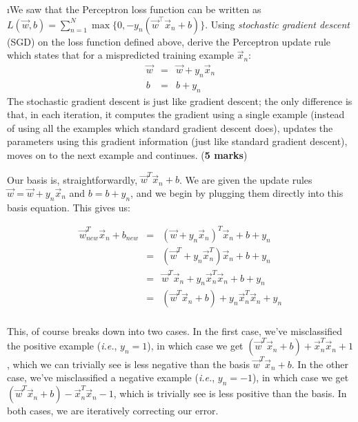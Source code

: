 \documentclass[fleqn]{article}
\begin{document}
\i We saw that the Perceptron loss function can be written
as $L(\vec{w},b) = \sum_{n=1}^N \max\{0,-y_n(\vec{w}^\top\vec{x}_n+b)\}$. 
Using \textit{stochastic gradient descent} (SGD) on the loss function 
defined above, derive the Perceptron update rule which states that 
for a mispredicted training example $\vec{x}_n$:
\begin{eqnarray}
 \vec{w} &=& \vec{w} + y_n \vec{x}_n \nonumber \\
  b &=& b + y_n \nonumber
\end{eqnarray}
The stochastic gradient descent is just like gradient descent; the only 
difference is that, in each iteration, it computes the gradient using a 
single example (instead of using all the examples which standard gradient
descent does), updates the parameters using this gradient information 
(just like standard gradient descent), moves on to the next example and 
continues. (\textbf{5 marks})

\begin{solution}
Our basis is, straightforwardly, $\vec{w}^T\vec{x}_n + b$. We are given the update rules $\vec{w} = \vec{w} + y_n\vec{x}_n$ and $b = b + y_n$, and we begin by plugging them directly into this basis equation. This gives us:

\begin{eqnarray*}
\vec{w}^T_{new}\vec{x}_n + b_{new} & = & (\vec{w} + y_n\vec{x}_n)^T \vec{x}_n + b + y_n \\
& = & (\vec{w}^T + y_n\vec{x}^T_n)\vec{x}_n + b + y_n \\
& = & \vec{w}^T\vec{x}_n + y_n\vec{x}^T_n\vec{x}_n + b + y_n \\
& = & (\vec{w}^T\vec{x}_n + b) + y_n\vec{x}^T_n\vec{x}_n + y_n \\
\end{eqnarray*}

This, of course breaks down into two cases. In the first case, we've misclassified the positive example (\textit{i.e.}, $y_n = 1$), in which case we get $(\vec{w}^T\vec{x}_n + b) + \vec{x}^T_n\vec{x}_n + 1$, which we can trivially see is less negative than the basis $\vec{w}^T\vec{x}_n + b$. In the other case, we've misclassified a negative example (\textit{i.e.}, $y_n = -1$), in which case we get $(\vec{w}^T\vec{x}_n + b) - \vec{x}^T_n\vec{x}_n - 1$, which is trivially see is less positive than the basis. In both cases, we are iteratively correcting our error.

\end{solution}
\end{document}
